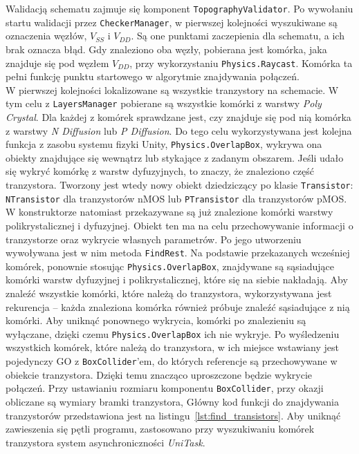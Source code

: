 Walidacją schematu zajmuje się komponent \texttt{TopographyValidator}.
Po wywołaniu startu walidacji przez \texttt{CheckerManager},
w pierwszej kolejności wyszukiwane są oznaczenia węzłów, $V_{SS}$ i $V_{DD}$.
Są one punktami zaczepienia dla schematu, a ich brak oznacza błąd.
Gdy znaleziono oba węzły, pobierana jest komórka, jaka znajduje się pod węzłem $V_{DD}$,
przy wykorzystaniu \texttt{Physics.Raycast}.
Komórka ta pełni funkcję punktu startowego w algorytmie znajdywania połączeń.\\
\indent W pierwszej kolejności lokalizowane są wszystkie tranzystory na schemacie.
W tym celu z \texttt{LayersManager} pobierane są wszystkie komórki z warstwy \textit{Poly Crystal}.
Dla każdej z komórek sprawdzane jest, 
czy znajduje się pod nią komórka z warstwy \textit{N Diffusion} lub \textit{P Diffusion}.
Do tego celu wykorzystywana jest kolejna funkcja z zasobu systemu fizyki Unity, \texttt{Physics.OverlapBox},
wykrywa ona obiekty znajdujące się wewnątrz lub stykające z zadanym obszarem.
Jeśli udało się wykryć komórkę z warstw dyfuzyjnych, to znaczy, że znaleziono część tranzystora.
Tworzony jest wtedy nowy obiekt dziedziczący po klasie \texttt{Transistor}:
\texttt{NTransistor} dla tranzystorów nMOS lub \texttt{PTransistor} dla tranzystorów pMOS.
W konstruktorze natomiast przekazywane są już znalezione komórki warstwy polikrystalicznej i dyfuzyjnej.
Obiekt ten ma na celu przechowywanie informacji o tranzystorze oraz wykrycie własnych parametrów.
Po jego utworzeniu wywoływana jest w nim metoda \texttt{FindRest}.
Na podstawie przekazanych wcześniej komórek, ponownie stosując \texttt{Physics.OverlapBox},
znajdywane są sąsiadujące komórki warstw dyfuzyjnej i polikrystalicznej, które się na siebie nakładają.
Aby znaleźć wszystkie komórki, które należą do tranzystora, wykorzystywana jest rekurencja
-- każda znaleziona komórka również próbuje znaleźć sąsiadujące z nią komórki.
Aby uniknąć ponownego wykrycia, komórki po znalezieniu są wyłączane,
dzięki czemu \texttt{Physics.OverlapBox} ich nie wykryje.
Po wyśledzeniu wszystkich komórek, które należą do tranzystora,
w ich miejsce wstawiany jest pojedynczy GO z \texttt{BoxCollider}'em,
do których referencje są przechowywane w obiekcie tranzystora.
Dzięki temu znacząco uproszczone będzie wykrycie połączeń.
Przy ustawianiu rozmiaru komponentu \texttt{BoxCollider}, przy okazji obliczane są wymiary bramki tranzystora,
Główny kod funkcji do znajdywania tranzystorów przedstawiona jest na listingu~\ref{lst:find_transistors}.
Aby uniknąć zawieszenia się pętli programu,
zastosowano przy wyszukiwaniu komórek tranzystora system asynchroniczności \textit{UniTask}.
\newpage

